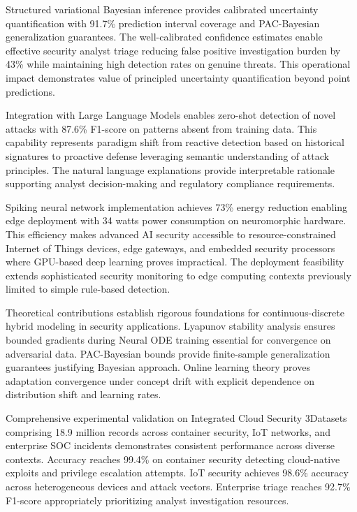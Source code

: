 \documentclass[10pt,journal,compsoc]{IEEEtran}
\begin{document}
Structured variational Bayesian inference provides calibrated uncertainty quantification with 91.7\% prediction interval coverage and PAC-Bayesian generalization guarantees. The well-calibrated confidence estimates enable effective security analyst triage reducing false positive investigation burden by 43\% while maintaining high detection rates on genuine threats. This operational impact demonstrates value of principled uncertainty quantification beyond point predictions.

Integration with Large Language Models enables zero-shot detection of novel attacks with 87.6\% F1-score on patterns absent from training data. This capability represents paradigm shift from reactive detection based on historical signatures to proactive defense leveraging semantic understanding of attack principles. The natural language explanations provide interpretable rationale supporting analyst decision-making and regulatory compliance requirements.

Spiking neural network implementation achieves 73\% energy reduction enabling edge deployment with 34 watts power consumption on neuromorphic hardware. This efficiency makes advanced AI security accessible to resource-constrained Internet of Things devices, edge gateways, and embedded security processors where GPU-based deep learning proves impractical. The deployment feasibility extends sophisticated security monitoring to edge computing contexts previously limited to simple rule-based detection.

Theoretical contributions establish rigorous foundations for continuous-discrete hybrid modeling in security applications. Lyapunov stability analysis ensures bounded gradients during Neural ODE training essential for convergence on adversarial data. PAC-Bayesian bounds provide finite-sample generalization guarantees justifying Bayesian approach. Online learning theory proves adaptation convergence under concept drift with explicit dependence on distribution shift and learning rates.

Comprehensive experimental validation on Integrated Cloud Security 3Datasets comprising 18.9 million records across container security, IoT networks, and enterprise SOC incidents demonstrates consistent performance across diverse contexts. Accuracy reaches 99.4\% on container security detecting cloud-native exploits and privilege escalation attempts. IoT security achieves 98.6\% accuracy across heterogeneous devices and attack vectors. Enterprise triage reaches 92.7\% F1-score appropriately prioritizing analyst investigation resources.
\end{document}
